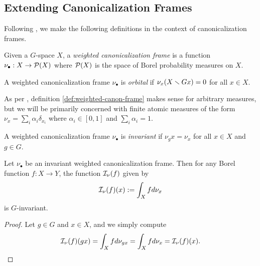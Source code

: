 \subsection{Extending Canonicalization Frames}\label{sec:canon-frame-work}



Following \cite{dym2024equivariant}, we make the following definitions in the context of canonicalization frames.

\begin{definition}
    Given a $G$-space $X$, a \emph{weighted canonicalization frame} is a function $\nu_\bullet : X \to \mathcal{P}(X)$ where $\mathcal{P}(X)$ is the space of Borel probability measures on $X$.
\end{definition}

\begin{definition}\label{def:weighted-canon-frame}
    A weighted canonicalization frame $\nu_\bullet$ is \emph{orbital} if $\nu_x(X \smallsetminus Gx) = 0$ for all $x \in X$.
\end{definition}


\begin{remark}
    As per \cite{dym2024equivariant}, definition \ref{def:weighted-canon-frame} makes sense for arbitrary measures, but we will be primarily concerned with finite atomic measures of the form $\nu_x = \sum_{i} \alpha_i \delta_{x_i}$ where $\alpha_i \in [0,1]$ and $\sum_i \alpha_i = 1$.
\end{remark}


\begin{definition}
    A weighted canonicalization frame $\nu_\bullet$ is \emph{invariant} if $\nu_gx = \nu_x$ for all $x \in X$ and $g \in G$.
\end{definition}


\begin{proposition}
    Let $\nu_\bullet$ be an invariant weighted canonicalization frame.
    Then for any Borel function $f : X \to Y$, the function $\mathcal{I}_\nu (f)$ given by
    \[
        \mathcal{I}_\nu (f) (x) := \int_X f d \nu_x
    \]
    is $G$-invariant.
    \begin{proof}
        Let $g \in G$ and $x \in X$, and we simply compute
        \[
            \mathcal{I}_\nu (f) (gx)
            = \int_X f d \nu_{gx}
            = \int_X f d \nu_x
            = \mathcal{I}_\nu (f) (x).
        \]
    \end{proof}
\end{proposition}


